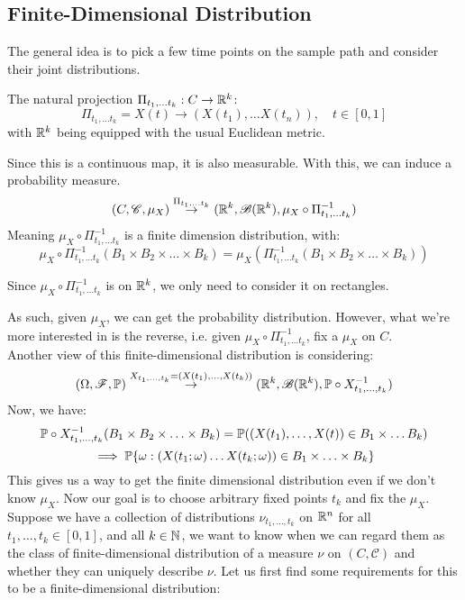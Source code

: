 \documentclass[../main/main.tex]{subfiles}
\begin{document}
\subsection{Finite-Dimensional Distribution}
The general idea is to pick a few time points on the sample path and consider their joint distributions.

\begin{definition}
	The natural projection $\Pi_{t_1, \ldots t_k}: C \to \R^{k}$:
	\[
		\Pi_{t_1, \ldots t_k}  = X(t) \to (X(t_1), \ldots X(t_n)), \quad t \in [0,1]
	\]
	with $\R^{k}$ being equipped with the usual Euclidean metric.
\end{definition}
Since this is a continuous map, it is also measurable. With this, we can induce a probability measure.
\[
	(C, \mathscr{C}, \mu_X)\overset{\Pi_{t_1, \ldots t_k} }{\to} (\R^{k}, \mathscr{B}(\R^{k}), \mu_X \circ \Pi_{t_1, \ldots t_k} ^{-1})
\]
Meaning $\mu_X \circ \Pi_{t_1, \ldots t_k} ^{-1}$ is a finite dimension distribution, with: \[
	\mu_X \circ \Pi_{t_1, \ldots t_k} ^{-1}(B_1 \times B_2 \times \ldots \times B_k) = \mu_X (\Pi_{t_1, \ldots t_k} ^{-1}(B_1 \times B_2 \times \ldots \times B_k) )
\]
\begin{remark}
	Since $ \mu_X \circ \Pi_{t_1, \ldots t_k} ^{-1} $ is on $\R^{k}$, we only need to consider it on rectangles.
\end{remark}

As such, given $\mu_X$, we can get the probability distribution. However, what we're more interested in is the reverse, i.e. given $\mu_X \circ \Pi_{t_1, \ldots t_k} ^{-1}$, fix a $\mu_X$ on $C$.\\
Another view of this finite-dimensional distribution is considering: \[
	(\Omega, \mathscr{F},\P ) \overset{X_{t_1, \ldots,t_k} = (X(t_1), \ldots, X(t_k))}{\to} (\R^{k}, \mathscr{B}(\R^{k}), \P \circ X^{-1}_{t_1, \ldots,t_k})
\] Now, we have: \[
	\P \circ X^{-1}_{t_1, \ldots,t_k}(B_1 \times B_2 \times \ldots \times B_k) = \P((X(t_1),\ldots,X(t)) \in B_{1} \times \ldots B_k)
\]
\[
	\implies \P \{\omega : (X(t_1;\omega)\ldots X(t_k;\omega)) \in B_1 \times \ldots \times B_k\}
\]
This gives us a way to get the finite dimensional distribution even if we don't know $\mu_X$. Now our goal is to choose arbitrary fixed points $t_k$ and fix the $\mu_X$.\\

Suppose we have a collection of distributions $\nu_{t_1, \ldots , t_k}$ on $\R^{n}$ for all $t_1, \ldots , t_k \in [0,1]$, and all $k \in \N$, we want to know when we can regard them as the class of finite-dimensional distribution  of a measure $\nu$ on $(C,\mathscr{C})$ and whether they can uniquely describe $\nu$. Let us first find some requirements for this to be a finite-dimensional distribution:
\end{document}
